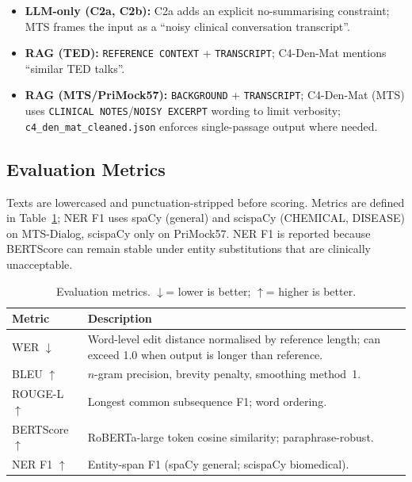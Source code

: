 \documentclass[11pt,a4paper,twocolumn]{article}
\newcommand{\up}{\textcolor{green!60!black}{$\uparrow$}}
\newcommand{\dn}{\textcolor{red!70!black}{$\downarrow$}}
\begin{document}
\begin{itemize}[leftmargin=1.2em, itemsep=1pt, topsep=2pt]
  \item \textbf{LLM-only (C2a, C2b):} C2a adds an explicit no-summarising
    constraint; MTS frames the input as a ``noisy clinical conversation
    transcript''.
  \item \textbf{RAG (TED):} \texttt{REFERENCE CONTEXT} + \texttt{TRANSCRIPT};
    C4-Den-Mat mentions ``similar TED talks''.
  \item \textbf{RAG (MTS/PriMock57):} \texttt{BACKGROUND} + \texttt{TRANSCRIPT};
    C4-Den-Mat (MTS) uses \texttt{CLINICAL NOTES}/\texttt{NOISY EXCERPT} wording
    to limit verbosity; \texttt{c4\_den\_mat\_cleaned.json} enforces single-passage
    output where needed.
\end{itemize}

\subsection{Evaluation Metrics}

Texts are lowercased and punctuation-stripped before scoring. Metrics are
defined in Table~\ref{tab:metrics}; NER F1 uses spaCy (general) and scispaCy
(CHEMICAL, DISEASE) on MTS-Dialog, scispaCy only on PriMock57. NER F1 is
reported because BERTScore can remain stable under entity substitutions that
are clinically unacceptable.

\begin{table}[H]
\centering
\caption{Evaluation metrics. \dn = lower is better; \up = higher is better.}
\label{tab:metrics}
\small
\renewcommand{\arraystretch}{1.2}
\begin{tabularx}{\columnwidth}{lX}
\toprule
\textbf{Metric} & \textbf{Description} \\
\midrule
WER \dn         & Word-level edit distance normalised by reference length; can exceed 1.0 when output is longer than reference. \\
BLEU \up        & $n$-gram precision, brevity penalty, smoothing method~1. \\
ROUGE-L \up     & Longest common subsequence F1; word ordering. \\
BERTScore \up   & RoBERTa-large token cosine similarity; paraphrase-robust. \\
NER F1 \up      & Entity-span F1 (spaCy general; scispaCy biomedical). \\
\bottomrule
\end{tabularx}
\end{table}
\end{document}
